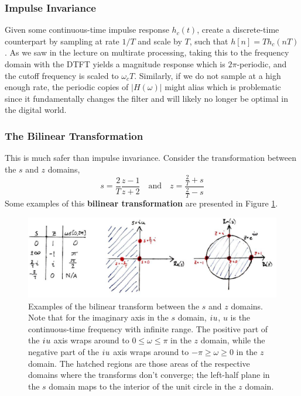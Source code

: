 \subsubsection{Impulse Invariance}
%
Given some continuous-time impulse response $h_c(t)$, create a discrete-time
counterpart by sampling at rate $1/T$ and scale by $T$, such that
$h[n] = Th_c(nT)$. As we saw in the lecture on multirate processing, taking
this to the frequency domain with the DTFT yields a magnitude response which
is $2\pi$-periodic, and the cutoff frequency is scaled to $\omega_c T$.
Similarly, if we do not sample at a high enough rate, the periodic copies of
$|H(\omega)|$ might alias which is problematic since it fundamentally changes
the filter and will likely no longer be optimal in the digital world.

\subsubsection{The Bilinear Transformation}
%
This is much safer than impulse invariance. Consider the transformation
between the $s$ and $z$ domains,
%
\begin{displaymath}
  s = \frac{2}{T}\frac{z-1}{z+2} \quad\mathrm{and}\quad
  z = \frac{\frac{2}{T} + s}{\frac{2}{T} - s}
\end{displaymath}
%
Some examples of this \textbf{bilinear transformation} are presented in
Figure \ref{fig::lecture_18_bilinear_transform}.
%
\begin{figure}[!htb]
  \includegraphics[width=\textwidth]{images/lecture_18_bilinear_transform.JPG}
  \caption{Examples of the bilinear transform between the $s$ and
    $z$ domains. Note that for the imaginary axis in the $s$ domain,
    ${i\mkern1mu} u$, $u$ is the continuous-time frequency with infinite range.
    The positive part of the ${i\mkern1mu} u$ axis wraps around to
    $0 \leq \omega \leq \pi$ in the $z$ domain, while the negative
    part of the ${i\mkern1mu} u$ axis wraps around to $-\pi \geq \omega \geq 0$
    in the $z$ domain. The hatched regions are those areas of the respective
    domains where the transforms don't converge; the left-half plane in
    the $s$ domain maps to the interior of the unit circle in the $z$ domain.
  }
  \label{fig::lecture_18_bilinear_transform}
\end{figure}
